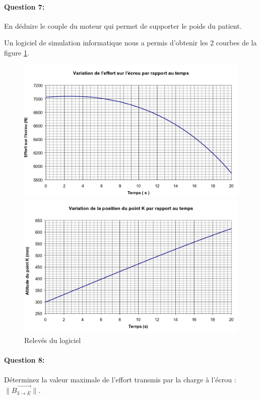 \paragraph{Question 7:} En déduire le couple du moteur qui permet de supporter le poids du patient.

Un logiciel de simulation informatique nous a permis d'obtenir les 2 courbes de la figure \ref{releves}.

\begin{figure}[!h]
 \begin{minipage}{0.45\linewidth}
 \centering\includegraphics[width=0.9\linewidth]{img/courbe1.png}
 \end{minipage}
 \hfill
 \begin{minipage}{0.45\linewidth}
 \centering\includegraphics[width=0.9\linewidth]{img/courbe2.png}
 \end{minipage}
 \caption{Relevés du logiciel}
 \label{releves}
\end{figure}

\paragraph{Question 8:} Déterminez la valeur maximale de l'effort transmis par la charge à l'écrou : $\|\overrightarrow{B_{3\rightarrow E}}\|$.

